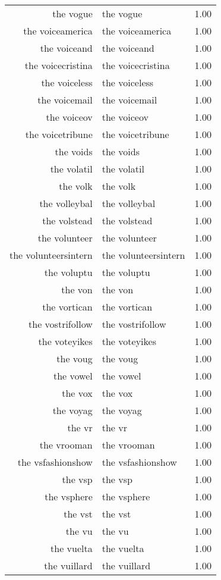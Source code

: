 \begin{table}[ht]
\begin{tabular}{rlr}
  the vogue & the vogue & 1.00 \\ 
  the voiceamerica & the voiceamerica & 1.00 \\ 
  the voiceand & the voiceand & 1.00 \\ 
  the voicecristina & the voicecristina & 1.00 \\ 
  the voiceless & the voiceless & 1.00 \\ 
  the voicemail & the voicemail & 1.00 \\ 
  the voiceov & the voiceov & 1.00 \\ 
  the voicetribune & the voicetribune & 1.00 \\ 
  the voids & the voids & 1.00 \\ 
  the volatil & the volatil & 1.00 \\ 
  the volk & the volk & 1.00 \\ 
  the volleybal & the volleybal & 1.00 \\ 
  the volstead & the volstead & 1.00 \\ 
  the volunteer & the volunteer & 1.00 \\ 
  the volunteersintern & the volunteersintern & 1.00 \\ 
  the voluptu & the voluptu & 1.00 \\ 
  the von & the von & 1.00 \\ 
  the vortican & the vortican & 1.00 \\ 
  the vostrifollow & the vostrifollow & 1.00 \\ 
  the voteyikes & the voteyikes & 1.00 \\ 
  the voug & the voug & 1.00 \\ 
  the vowel & the vowel & 1.00 \\ 
  the vox & the vox & 1.00 \\ 
  the voyag & the voyag & 1.00 \\ 
  the vr & the vr & 1.00 \\ 
  the vrooman & the vrooman & 1.00 \\ 
  the vsfashionshow & the vsfashionshow & 1.00 \\ 
  the vsp & the vsp & 1.00 \\ 
  the vsphere & the vsphere & 1.00 \\ 
  the vst & the vst & 1.00 \\ 
  the vu & the vu & 1.00 \\ 
  the vuelta & the vuelta & 1.00 \\ 
  the vuillard & the vuillard & 1.00 \\ 

\end{tabular}
\end{table}
